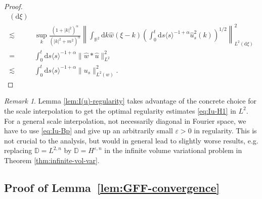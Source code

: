\documentclass[11pt, a4paper]{scrartcl}
\numberwithin{equation}{section}
\theoremstyle{plain}
\theoremstyle{remark}
\newtheorem{remark}[foo]{Remark}
\newcommand{\mathd}{\mathrm{d}}
\begin{document}
\begin{proof}
{\begin{align*}
{				(\mathd \xi)}                                                                 \\
				\lesssim & \sup_k  \frac{(1 + | k |^2)^{\alpha}}{(| k |^2 +
					m^2)^{\alpha}} \left\| \int_{\mathbb{R}^2} \mathd k \hat{w} (\xi - k)
				\left( \int_0^t \mathd s \langle s \rangle^{- 1 + \alpha}  \hat{u}_s^2
				(k) \right)^{1 / 2} \right\|^2_{L^2 (\mathd \xi)}                             \\
				=        & \int_0^t \mathd s \langle s \rangle^{- 1 + \alpha} \| \hat{w} \ast
				\hat{u} \|_{L^2}^2                                                            \\
				\lesssim & \int_0^t \mathd s \langle s \rangle^{- 1 + \alpha} \| u_s
				\|_{L^2 (w)}^2 .
			\end{align*}}

\end{proof}

\begin{remark}
	Lemma \ref{lem:I(u)-regularity} takes advantage of the concrete choice for
	the scale interpolation to get the optimal regularity estimates
	\eqref{eq:Iu-H1} in $L^2$. For a general scale interpolation, not
	necessarily diagonal in Fourier space, we have to use \eqref{eq:Iu-Bp} and
	give up an arbitrarily small $\varepsilon > 0$ in regularity. This is not
	crucial to the analysis, but would in general lead to slightly worse
	results, e.g. replacing $\mathbb{D}= L^{2, n}$ by $\mathbb{D}=
		H^{\varepsilon, n}$ in the infinite volume variational problem in Theorem
	\ref{thm:infinite-vol-var}.
\end{remark}

\subsection{Proof of
	Lemma~\ref{lem:GFF-convergence}}\label{app:GFF-convergence}
\end{document}
